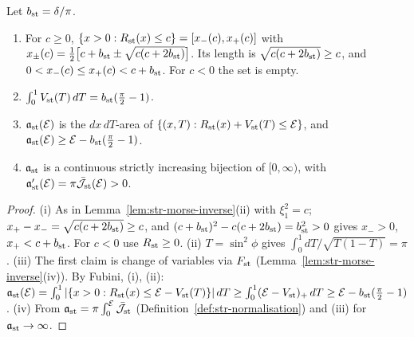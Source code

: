 \begin{lemma}\label{lem:str-area}
Let $b_{\rm st}=\delta/\pi$.
\begin{enumerate}[label=(\roman*)]
\item For $c\ge0$, $\{x>0:R_{\rm st}(x)\le c\}=[x_-(c),x_+(c)]$ with
$x_\pm(c)=\frac12\big[c+b_{\rm st}\pm\sqrt{c(c+2b_{\rm st})}\big]$. Its length is $\sqrt{c(c+2b_{\rm st})}\ge c$, and
$0<x_-(c)\le x_+(c)<c+b_{\rm st}$. For $c<0$ the set is empty.
\item $\int_0^1V_{\rm st}(T)\,dT=b_{\rm st}(\frac\pi2-1)$.
\item $\mathfrak a_{\rm st}(\mathcal E)$ is the $dx\,dT$-area of $\{(x,T):R_{\rm st}(x)+V_{\rm st}(T)\le\mathcal E\}$, and
$\mathfrak a_{\rm st}(\mathcal E)\ge\mathcal E-b_{\rm st}(\frac\pi2-1)$.
\item $\mathfrak a_{\rm st}$ is a continuous strictly increasing bijection of $[0,\infty)$, with
$\mathfrak a_{\rm st}'(\mathcal E)=\pi\bar{\mathcal J}_{\rm st}(\mathcal E)>0$.
\end{enumerate}
\end{lemma}

\begin{proof}
(i) As in Lemma~\ref{lem:str-morse-inverse}(ii) with $\xi_1^2=c$; $x_+-x_-=\sqrt{c(c+2b_{\rm st})}\ge c$, and $(c+b_{\rm st})^2-c(c+2b_{\rm st})=b_{\rm st}^2>0$ gives $x_->0$, $x_+<c+b_{\rm st}$. For $c<0$ use $R_{\rm st}\ge0$.
(ii) $T=\sin^2\phi$ gives $\int_0^1dT/\sqrt{T(1-T)}=\pi$.
(iii) The first claim is change of variables via $F_{\rm st}$ (Lemma~\ref{lem:str-morse-inverse}(iv)). By Fubini, (i), (ii): $\mathfrak a_{\rm st}(\mathcal E)=\int_0^1|\{x>0:R_{\rm st}(x)\le\mathcal E-V_{\rm st}(T)\}|\,dT\ge\int_0^1(\mathcal E-V_{\rm st})_+\,dT\ge\mathcal E-b_{\rm st}(\tfrac\pi2-1)$.
(iv) From $\mathfrak a_{\rm st}=\pi\int_0^{\mathcal E}\bar{\mathcal J}_{\rm st}$ (Definition~\ref{def:str-normalisation}) and (iii) for $\mathfrak a_{\rm st}\to\infty$.
\end{proof}

